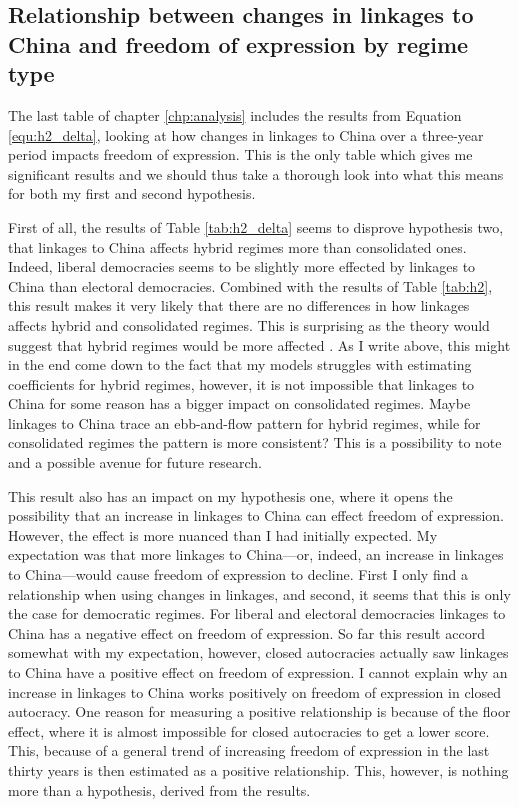 \subsection{Relationship between changes in linkages to China and freedom of expression by regime type}
The last table of chapter \ref{chp:analysis} includes the results from Equation \ref{equ:h2_delta}, looking at how changes in linkages to China over a three-year period impacts freedom of expression. This is the only table which gives me significant results and we should thus take a thorough look into what this means for both my first and second hypothesis.

First of all, the results of Table \ref{tab:h2_delta} seems to disprove hypothesis two, that linkages to China affects hybrid regimes more than consolidated ones. Indeed, liberal democracies seems to be slightly more effected by linkages to China than electoral democracies. Combined with the results of Table \ref{tab:h2}, this result  makes it very likely that there are no differences in how linkages affects hybrid and consolidated regimes. This is surprising as the theory would suggest that hybrid regimes would be more affected \citep{tansey_ties_2017, toettoe_foreign_2023}. As I write above, this might in the end come down to the fact that my models struggles with estimating coefficients for hybrid regimes, however, it is not impossible that linkages to China for some reason has a bigger impact on consolidated regimes. Maybe linkages to China trace an ebb-and-flow pattern for hybrid regimes, while for consolidated regimes the pattern is more consistent? This is a possibility to note and a possible avenue for future research.

This result also has an impact on my hypothesis one, where it opens the possibility that an increase in linkages to China can effect freedom of expression. However, the effect is more nuanced than I had initially expected. My expectation was that more linkages to China---or, indeed, an increase in linkages to China---would cause freedom of expression to decline. First I only find a relationship when using changes in linkages, and second, it seems that this is only the case for democratic regimes. For liberal and electoral democracies linkages to China has a negative effect on freedom of expression. So far this result accord somewhat with my expectation, however, closed autocracies actually saw linkages to China have a positive effect on freedom of expression. I cannot explain why an increase in linkages to China works positively on freedom of expression in closed autocracy. One reason for measuring a positive relationship is because of the floor effect, where it is almost impossible for closed autocracies to get a lower score. This, because of a general trend of increasing freedom of expression in the last thirty years is then estimated as a positive relationship. This, however, is nothing more than a hypothesis, derived from the results.

